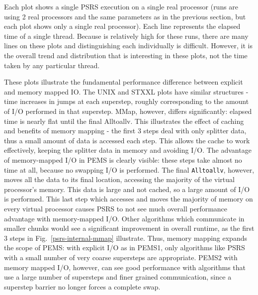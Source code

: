 \documentclass[12pt]{carletoncsthesis}
\begin{document}
Each plot shows a single PSRS execution on a single real processor (runs are
using 2 real processors and the same parameters as in the previous section,
but each plot shows only a single real processor).  Each line represents the
elapsed time of a single thread.  Because  is relatively high
for these runs, there are many lines on these plots and distinguishing each
individually is difficult.  However, it is the overall trend and distribution
that is interesting in these plots, not the time taken by any particular
thread.

These plots illustrate the fundamental performance difference between explicit
and memory mapped IO.  The UNIX and STXXL plots have similar structures -
time increases in jumps at each superstep, roughly corresponding to the amount
of I/O performed in that superstep.  MMap, however, differs significantly:
elapsed time is nearly flat until the final Alltoallv.  This illustrates the
effect of caching and benefits of memory mapping - the first 3 steps deal
with only splitter data, thus a small amount of data is accessed each step.
This allows the cache to work effectively, keeping the splitter data in
memory and avoiding I/O.  The advantage of memory-mapped I/O in PEMS is
clearly visible: these steps take almost no time at all, because no swapping
I/O is performed.  The final {\tt Alltoallv}, however, moves all the data to
its final location, accessing the majority of the virtual processor's memory.
This data is large and not cached, so a large amount of I/O is performed.
This last step which accesses and moves the majority of memory on every
virtual processor causes PSRS to not see much overall performance advantage
with memory-mapped I/O.  Other algorithms which communicate in smaller chunks
would see a significant improvement in overall runtime, as the first 3 steps
in Fig.~\ref{psrs-internal-mmap} illustrate.  Thus, memory mapping expands
the scope of PEMS: with explicit I/O as in PEMS1, only algorithms like PSRS
with a small number of very coarse supersteps are appropriate.  PEMS2 with
memory mapped I/O, however, can see good performance with algorithms that
use a large number of supersteps and finer grained communication, since a
superstep barrier no longer forces a complete swap.
\end{document}

